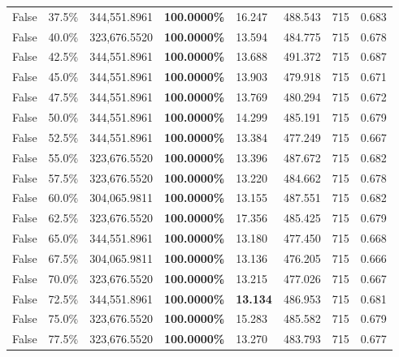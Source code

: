 \begin{table}[H]
\begin{tabular}{lllrllll}
\cline{1-8}
False & 37.5\% & 344,551.8961 & \bfseries \color{red} 100.0000\% & 16.247 & 488.543 & 715 & 0.683 \\
\cline{1-8}
False & 40.0\% & 323,676.5520 & \bfseries \color{red} 100.0000\% & 13.594 & 484.775 & 715 & 0.678 \\
\cline{1-8}
False & 42.5\% & 344,551.8961 & \bfseries \color{red} 100.0000\% & 13.688 & 491.372 & 715 & 0.687 \\
\cline{1-8}
False & 45.0\% & 344,551.8961 & \bfseries \color{red} 100.0000\% & 13.903 & 479.918 & 715 & 0.671 \\
\cline{1-8}
False & 47.5\% & 344,551.8961 & \bfseries \color{red} 100.0000\% & 13.769 & 480.294 & 715 & 0.672 \\
\cline{1-8}
False & 50.0\% & 344,551.8961 & \bfseries \color{red} 100.0000\% & 14.299 & 485.191 & 715 & 0.679 \\
\cline{1-8}
False & 52.5\% & 344,551.8961 & \bfseries \color{red} 100.0000\% & 13.384 & 477.249 & 715 & 0.667 \\
\cline{1-8}
False & 55.0\% & 323,676.5520 & \bfseries \color{red} 100.0000\% & 13.396 & 487.672 & 715 & 0.682 \\
\cline{1-8}
False & 57.5\% & 323,676.5520 & \bfseries \color{red} 100.0000\% & 13.220 & 484.662 & 715 & 0.678 \\
\cline{1-8}
False & 60.0\% & \color{red} 304,065.9811 & \bfseries \color{red} 100.0000\% & 13.155 & 487.551 & 715 & 0.682 \\
\cline{1-8}
False & 62.5\% & 323,676.5520 & \bfseries \color{red} 100.0000\% & 17.356 & 485.425 & 715 & 0.679 \\
\cline{1-8}
False & 65.0\% & 344,551.8961 & \bfseries \color{red} 100.0000\% & 13.180 & 477.450 & 715 & 0.668 \\
\cline{1-8}
False & 67.5\% & \color{red} 304,065.9811 & \bfseries \color{red} 100.0000\% & 13.136 & 476.205 & 715 & 0.666 \\
\cline{1-8}
False & 70.0\% & 323,676.5520 & \bfseries \color{red} 100.0000\% & 13.215 & 477.026 & 715 & 0.667 \\
\cline{1-8}
False & 72.5\% & 344,551.8961 & \bfseries \color{red} 100.0000\% & \bfseries \color{red} 13.134 & 486.953 & 715 & 0.681 \\
\cline{1-8}
False & 75.0\% & 323,676.5520 & \bfseries \color{red} 100.0000\% & 15.283 & 485.582 & 715 & 0.679 \\
\cline{1-8}
False & 77.5\% & 323,676.5520 & \bfseries \color{red} 100.0000\% & 13.270 & 483.793 & 715 & 0.677 \\

\end{tabular}
\end{table}
